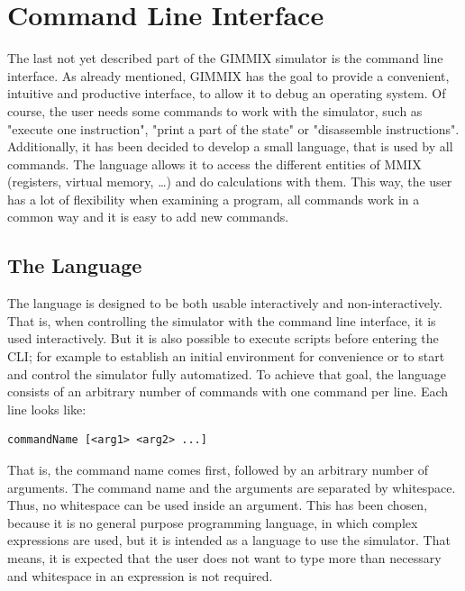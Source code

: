 \section{Command Line Interface}

The last not yet described part of the GIMMIX simulator is the command line interface. As already mentioned, GIMMIX has the goal to provide a convenient, intuitive and productive interface, to allow it to debug an operating system. Of course, the user needs some commands to work with the simulator, such as "execute one instruction", "print a part of the state" or "disassemble instructions". Additionally, it has been decided to develop a small language, that is used by all commands. The language allows it to access the different entities of MMIX (registers, virtual memory, \dots) and do calculations with them. This way, the user has a lot of flexibility when examining a program, all commands work in a common way and it is easy to add new commands.

\subsection{The Language}

The language is designed to be both usable interactively and non-interactively. That is, when controlling the simulator with the command line interface, it is used interactively. But it is also possible to execute scripts before entering the CLI; for example to establish an initial environment for convenience or to start and control the simulator fully automatized. To achieve that goal, the language consists of an arbitrary number of commands with one command per line. Each line looks like:
\begin{verbatim}
commandName [<arg1> <arg2> ...]
\end{verbatim}
That is, the command name comes first, followed by an arbitrary number of arguments. The command name and the arguments are separated by whitespace. Thus, no whitespace can be used inside an argument. This has been chosen, because it is no general purpose programming language, in which complex expressions are used, but it is intended as a language to use the simulator. That means, it is expected that the user does not want to type more than necessary and whitespace in an expression is not required.

